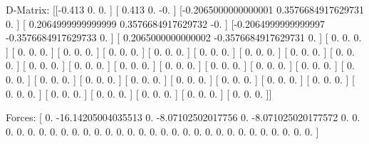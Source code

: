 D-Matrix:
[[-0.413               0.                  0.                ]
 [ 0.413               0.                 -0.                ]
 [-0.2065000000000001  0.3576684917629731  0.                ]
 [ 0.2064999999999999  0.3576684917629732 -0.                ]
 [-0.2064999999999997 -0.3576684917629733  0.                ]
 [ 0.2065000000000002 -0.3576684917629731  0.                ]
 [ 0.                  0.                  0.                ]
 [ 0.                  0.                  0.                ]
 [ 0.                  0.                  0.                ]
 [ 0.                  0.                  0.                ]
 [ 0.                  0.                  0.                ]
 [ 0.                  0.                  0.                ]
 [ 0.                  0.                  0.                ]
 [ 0.                  0.                  0.                ]
 [ 0.                  0.                  0.                ]
 [ 0.                  0.                  0.                ]
 [ 0.                  0.                  0.                ]
 [ 0.                  0.                  0.                ]
 [ 0.                  0.                  0.                ]
 [ 0.                  0.                  0.                ]
 [ 0.                  0.                  0.                ]
 [ 0.                  0.                  0.                ]
 [ 0.                  0.                  0.                ]
 [ 0.                  0.                  0.                ]
 [ 0.                  0.                  0.                ]
 [ 0.                  0.                  0.                ]
 [ 0.                  0.                  0.                ]
 [ 0.                  0.                  0.                ]
 [ 0.                  0.                  0.                ]
 [ 0.                  0.                  0.                ]
 [ 0.                  0.                  0.                ]
 [ 0.                  0.                  0.                ]
 [ 0.                  0.                  0.                ]
 [ 0.                  0.                  0.                ]
 [ 0.                  0.                  0.                ]
 [ 0.                  0.                  0.                ]]

Forces:
[  0.                -16.14205004035513    0.
  -8.07102502017756    0.                 -8.071025020177572
   0.                  0.                  0.
   0.                  0.                  0.
   0.                  0.                  0.
   0.                  0.                  0.
   0.                  0.                  0.
   0.                  0.                  0.
   0.                  0.                  0.
   0.                  0.                  0.
   0.                  0.                  0.
   0.                  0.                  0.               ]


